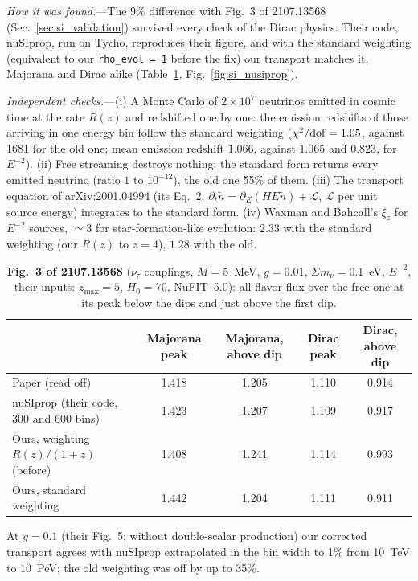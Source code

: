 \documentclass[11pt,a4paper]{article}
\newcommand{\nusum}{\Sigma m_\nu}
\begin{document}
\textit{How it was found.}---The 9\% difference with Fig.~3 of 2107.13568
(Sec.~\ref{sec:si_validation}) survived every check of the Dirac physics. Their code, nuSIprop, run on
Tycho, reproduces their figure, and with the standard weighting (equivalent to our
\texttt{rho\_evol = 1} before the fix) our transport matches it, Majorana and Dirac alike
(Table~\ref{tab:source_checks}, Fig.~\ref{fig:si_nusiprop}).

\textit{Independent checks.}---(i) A Monte Carlo of $2\times10^7$ neutrinos emitted in cosmic time at
the rate $R(z)$ and redshifted one by one: the emission redshifts of those arriving in one energy bin
follow the standard weighting ($\chi^2/{\rm dof} = 1.05$, against 1681 for the old one; mean emission
redshift $1.066$, against $1.065$ and $0.823$, for $E^{-2}$). (ii) Free streaming destroys nothing:
the standard form returns every emitted neutrino (ratio $1$ to $10^{-12}$), the old one 55\% of them.
(iii) The transport equation of arXiv:2001.04994 (its Eq.~2,
$\partial_t\tilde n = \partial_E(HE\tilde n) + \mathcal L$, $\mathcal L$ per unit source energy)
integrates to the standard form. (iv) Waxman and Bahcall's $\xi_z$ for $E^{-2}$ sources, $\simeq3$ for
star-formation-like evolution: $2.33$ with the standard weighting (our $R(z)$ to $z = 4$), $1.28$ with
the old.

\begin{table}[h]
\centering
\caption{\textbf{Fig.~3 of 2107.13568} ($\nu_\tau$ couplings, $M = 5$~MeV, $g = 0.01$,
$\nusum = 0.1$~eV, $E^{-2}$, their inputs: $z_{\max} = 5$, $H_0 = 70$, NuFIT~5.0): all-flavor flux over
the free one at its peak below the dips and just above the first dip.}
\label{tab:source_checks}
\small
\begin{tabular}{lcccc}
\toprule
 & Majorana peak & Majorana, above dip & Dirac peak & Dirac, above dip \\
\midrule
Paper (read off) & 1.418 & 1.205 & 1.110 & 0.914 \\
nuSIprop (their code, 300 and 600 bins) & 1.423 & 1.207 & 1.109 & 0.917 \\
Ours, weighting $R(z)/(1+z)$ (before) & 1.408 & 1.241 & 1.114 & 0.993 \\
Ours, standard weighting & 1.442 & 1.204 & 1.111 & 0.911 \\
\bottomrule
\end{tabular}
\end{table}

At $g = 0.1$ (their Fig.~5; without double-scalar production) our corrected transport agrees with
nuSIprop extrapolated in the bin width to 1\% from 10~TeV to 10~PeV; the old weighting was off by up
to 35\%.
\end{document}
